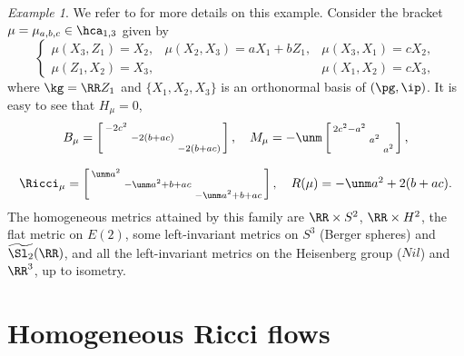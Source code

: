 \documentclass[11pt]{amsart}
\theoremstyle{plain}
\theoremstyle{definition}
\theoremstyle{remark}
\newtheorem{example}[theorem]{Example}
\begin{document}
\begin{example}\label{ex1-3ricci}
We refer to \cite[Example 3.3]{spacehm} for more details on this example.  Consider the bracket $\mu=\mu_{a,b,c}\in\hca_{1,3}$ given by
$$
\left\{\begin{array}{lll}
\mu(X_3,Z_1)=X_2, & \mu(X_2,X_3)=aX_1+bZ_1, & \mu(X_3,X_1)=cX_2, \\
\mu(Z_1,X_2)=X_3, &                           & \mu(X_1,X_2)=cX_3,
\end{array}\right.
$$
where $\kg=\RR Z_1$ and $\{ X_1,X_2,X_3\}$ is an orthonormal basis of $(\pg,\ip)$.  It is easy to see that $H_{\mu}=0$,
$$
\begin{array}{c}
B_\mu=\left[\begin{smallmatrix} -2c^2&&\\ &-2(b+ac)& \\ && -2(b+ac)\end{smallmatrix}\right], \quad
M_\mu=-\unm\left[\begin{smallmatrix} 2c^2-a^2&&\\ &a^2& \\ &&a^2\end{smallmatrix}\right], \\ \\
\Ricci_\mu=\left[\begin{smallmatrix} \unm a^2&&\\ &-\unm a^2+b+ac& \\ &&-\unm a^2+b+ac\end{smallmatrix}\right], \quad
R(\mu)=-\unm a^2+2(b+ac).
\end{array}
$$
The homogeneous metrics attained by this family are
$\RR\times S^2$, $\RR\times H^2$, the flat metric on $E(2)$, some left-invariant metrics on $S^3$ (Berger spheres) and $\widetilde{\Sl_2}(\RR)$, and all the left-invariant metrics on the Heisenberg group ($Nil$) and $\RR^3$, up to isometry.
\end{example}



















\section{Homogeneous Ricci flows}\label{hrf}
\end{document}
